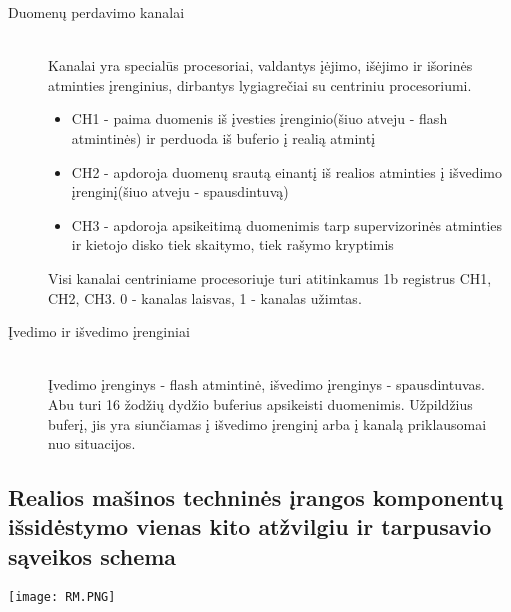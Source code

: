 \begin{description}
  \item[Duomenų perdavimo kanalai] \leavevmode \\
Kanalai yra specialūs procesoriai, valdantys įėjimo, išėjimo ir išorinės atminties įrenginius, dirbantys lygiagrečiai su centriniu procesoriumi.
\begin{itemize}
  \item CH1 - paima duomenis iš įvesties įrenginio(šiuo atveju - flash atmintinės) ir perduoda iš buferio į realią atmintį
  \item CH2 - apdoroja duomenų srautą einantį iš realios atminties į išvedimo įrenginį(šiuo atveju - spausdintuvą)
  \item CH3 - apdoroja apsikeitimą duomenimis tarp supervizorinės atminties ir kietojo disko tiek skaitymo, tiek rašymo kryptimis
\end{itemize}
Visi kanalai centriniame procesoriuje turi atitinkamus 1b registrus CH1, CH2, CH3. 0 - kanalas laisvas, 1 - kanalas užimtas.


  \item[Įvedimo ir išvedimo įrenginiai] \leavevmode \\
Įvedimo įrenginys - flash atmintinė, išvedimo įrenginys - spausdintuvas. Abu turi 16 žodžių dydžio buferius apsikeisti duomenimis. Užpildžius buferį, jis yra siunčiamas
į išvedimo įrenginį arba į kanalą priklausomai nuo situacijos.



\end{description}

\subsection{Realios mašinos techninės įrangos komponentų išsidėstymo vienas kito atžvilgiu ir tarpusavio sąveikos schema}
\texttt{[image: RM.PNG]}
